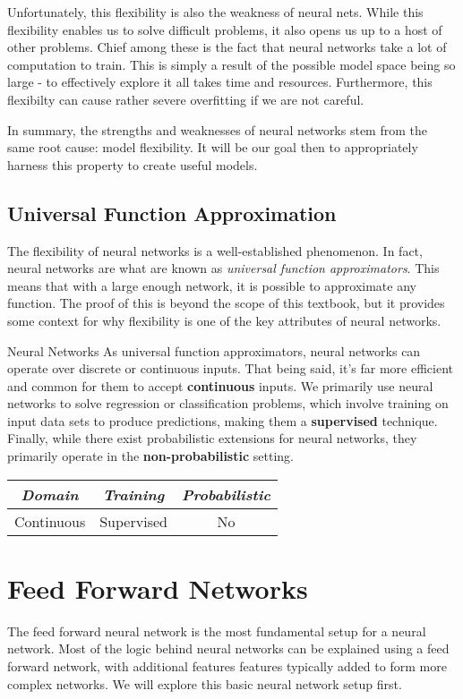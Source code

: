 Unfortunately, this flexibility is also the weakness of neural nets. While this flexibility enables us to solve difficult problems, it also opens us up to a host of other problems. Chief among these is the fact that neural networks take a lot of computation to train. This is simply a result of the possible model space being so large - to effectively explore it all takes time and resources. Furthermore, this flexibilty can cause rather severe overfitting if we are not careful.

In summary, the strengths and weaknesses of neural networks stem from the same root cause: model flexibility. It will be our goal then to appropriately harness this property to create useful models.

\subsection{Universal Function Approximation}
The flexibility of neural networks is a well-established phenomenon. In fact, neural networks are what are known as \textit{universal function approximators}. This means that with a large enough network, it is possible to approximate any function. The proof of this is beyond the scope of this textbook, but it provides some context for why flexibility is one of the key attributes of neural networks.

\begin{mlcube}{Neural Networks}
As universal function approximators, neural networks can operate over discrete or continuous inputs. That being said, it's far more efficient and common for them to accept \textbf{continuous} inputs. We primarily use neural networks to solve regression or classification problems, which involve training on input data sets to produce predictions, making them a \textbf{supervised} technique. Finally, while there exist probabilistic extensions for neural networks, they primarily operate in the \textbf{non-probabilistic} setting.
\begin{center}
    \begin{tabular}{c|c|c}
    \textit{\textbf{Domain}} & \textit{\textbf{Training}} & \textit{\textbf{Probabilistic}} \\
    \hline
    Continuous & Supervised & No \\
    \end{tabular}
\end{center}
\end{mlcube}

\section{Feed Forward Networks}
The feed forward neural network is the most fundamental setup for a neural network. Most of the logic behind neural networks can be explained using a feed forward network, with additional features features typically added to form more complex networks. We will explore this basic neural network setup first.


